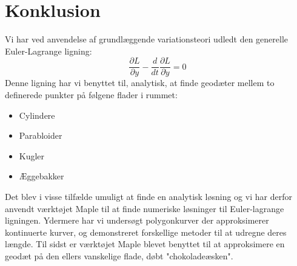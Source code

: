 \section{Konklusion}
Vi har ved anvendelse af grundlæggende variationsteori udledt den generelle Euler-Lagrange ligning:
$$\frac{\partial L}{\partial y}-\frac{d}{dt}\frac{\partial L}{\partial \dot{y}}=0$$
Denne ligning har vi benyttet til, analytisk, at finde geodæter mellem to definerede punkter på følgene flader i rummet:
\begin{itemize}
\item Cylindere
\item Parabloider
\item Kugler
\item Æggebakker
\end{itemize}
Det blev i visse tilfælde umuligt at finde en analytisk løsning og vi har derfor anvendt værktøjet Maple til at finde numeriske løsninger til Euler-lagrange ligningen. Ydermere har vi undersøgt polygonkurver der approksimerer kontinuerte kurver, og demonstreret forskellige metoder til at udregne deres længde. Til sidst er værktøjet Maple blevet benyttet til at approksimere en geodæt på den ellers vanskelige flade, døbt "chokoladeæsken".